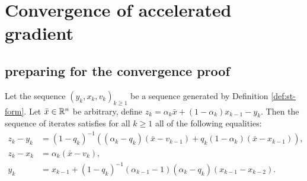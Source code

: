 \documentclass[12pt]{article}
\begin{document}
\section{Convergence of accelerated gradient}
    \subsection{preparing for the convergence proof}
        \begin{lemma}\label{lemma:cnvg-prep-part1}
            Let the sequence $(y_k, x_k, v_k)_{k \ge 1}$ be a sequence generated by Definition \ref{def:st-form}. 
            Let $\bar x \in \mathbb R^n$ be arbitrary, define $z_k = \alpha_k \bar x + (1 - \alpha_k)x_{k - 1} - y_k$. 
            Then the sequence of iterates satisfies for all $k \ge 1$ all of the following equalities: 
            \begin{align*}
                z_k - y_k &= (1 - q_k)^{-1}\left(
                    (\alpha_k - q_k)(\bar x - v_{k - 1}) + q_k(1 - \alpha_k)(\bar x - x_{k - 1})
                \right), 
                \\
                z_k - x_k &= \alpha_k (\bar x - v_k), 
                \\
                y_k &= x_{k -1} + (1 - q_k)^{-1}(\alpha_{k - 1} - 1)(\alpha_k - q_k)(x_{k - 1} - x_{k - 2}). 
            \end{align*}
        \end{lemma}
\end{document}
